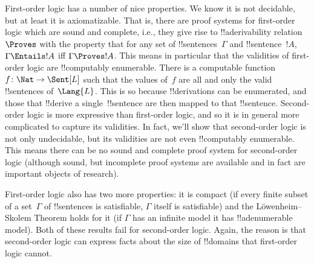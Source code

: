 \documentclass[../../../include/open-logic-section]{subfiles}
\begin{document}


First-order logic has a number of nice properties. We know it is not
decidable, but at least it is axiomatizable. That is, there are proof
systems for first-order logic which are sound and complete, i.e., they
give rise to !!a{derivability} relation~$\Proves$ with the property
that for any set of !!{sentence}s~$\Gamma$ and !!{sentence}~$!A$,
$\Gamma \Entails !A$ iff $\Gamma \Proves !A$.  This means in
particular that the validities of first-order logic are !!{computably
  enumerable}. There is a computable function~$f\colon \Nat \to
\Sent[L]$ such that the values of~$f$ are all and only the valid
!!{sentence}s of~$\Lang{L}$. This is so because !!{derivation}s can be
enumerated, and those that !!{derive} a single~!!{sentence} are then
mapped to that !!{sentence}.  Second-order logic is more expressive
than first-order logic, and so it is in general more complicated to
capture its validities.  In fact, we'll show that second-order logic
is not only undecidable, but its validities are not even !!{computably
  enumerable}. This means there can be no sound and complete proof
system for second-order logic (although sound, but incomplete proof
systems are available and in fact are important objects of research).

First-order logic also has two more properties: it is compact (if
every finite subset of a set~$\Gamma$ of !!{sentence}s is satisfiable,
$\Gamma$ itself is satisfiable) and the L\"owenheim--Skolem Theorem
holds for it (if $\Gamma$ has an infinite model it has
!!a{denumerable} model). Both of these results fail for second-order
logic. Again, the reason is that second-order logic can express facts
about the size of !!{domain}s that first-order logic cannot.
\end{document}
